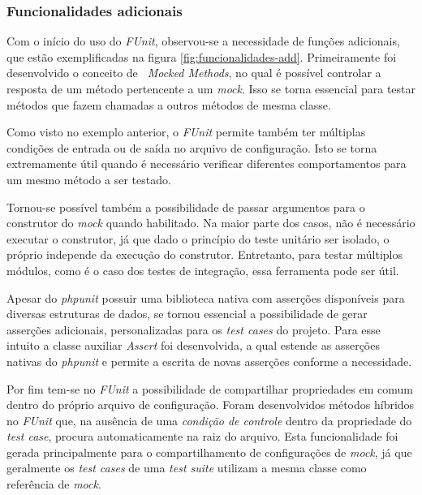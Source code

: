 \hypertarget{funcionalidades-adicionais}{%
\subsubsection{Funcionalidades adicionais}\label{funcionalidades-adicionais}}

Com o início do uso do \emph{FUnit}, observou-se a necessidade de funções adicionais, que estão exemplificadas na figura \ref{fig:funcionalidades-add}. Primeiramente foi desenvolvido o conceito de \emph{~Mocked Methods}, no qual é possível controlar a resposta de um método pertencente a um \emph{mock}. Isso se torna essencial para testar métodos que fazem chamadas a outros métodos de mesma classe.

Como visto no exemplo anterior, o \emph{FUnit} permite também ter múltiplas condições de entrada ou de saída no arquivo de configuração. Isto se torna extremamente útil quando é necessário verificar diferentes comportamentos para um mesmo método a ser testado.

Tornou-se possível também a possibilidade de passar argumentos para o construtor do \emph{mock} quando habilitado. Na maior parte dos casos, não é necessário executar o construtor, já que dado o princípio do teste unitário ser isolado, o próprio independe da execução do construtor. Entretanto, para testar múltiplos módulos, como é o caso dos testes de integração, essa ferramenta pode ser útil.

Apesar do \emph{phpunit} possuir uma biblioteca nativa com asserções disponíveis para diversas estruturas de dados, se tornou essencial a possibilidade de gerar asserções adicionais, personalizadas para os \emph{test cases} do projeto. Para esse intuito a classe auxiliar \emph{Assert} foi desenvolvida, a qual estende as asserções nativas do \emph{phpunit} e permite a escrita de novas asserções conforme a necessidade.

Por fim tem-se no \emph{FUnit} a possibilidade de compartilhar propriedades em comum dentro do próprio arquivo de configuração. Foram desenvolvidos métodos híbridos no \emph{FUnit} que, na ausência de uma \emph{condição de controle} dentro da propriedade do \emph{test case}, procura automaticamente na raiz do arquivo. Esta funcionalidade foi gerada principalmente para o compartilhamento de configurações de \emph{mock}, já que geralmente os \emph{test cases} de uma \emph{test suite} utilizam a mesma classe como referência de \emph{mock}.

